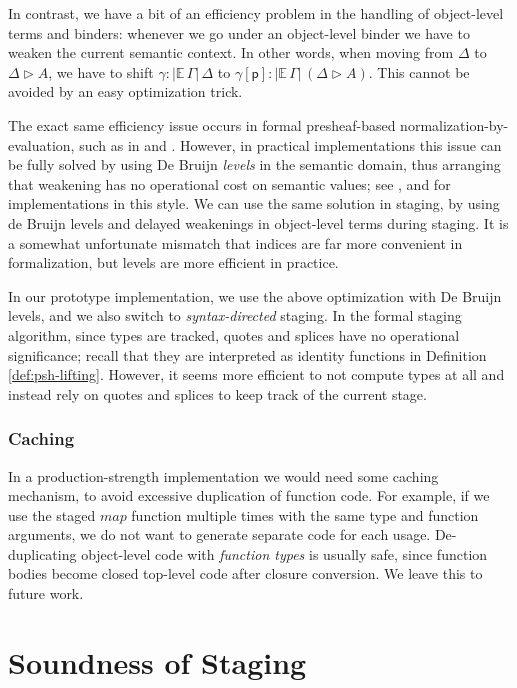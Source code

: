 \documentclass[acmsmall]{acmart}
\newcommand{\mit}[1]{\mathit{#1}}
\newcommand{\mbb}[1]{\mathbb{#1}}
\newcommand{\ext}{\triangleright}
\newcommand{\p}{\mathsf{p}}
\newcommand{\ev}{\mbb{E}}
\theoremstyle{remark}
\begin{document}
In contrast, we have a bit of an efficiency problem in the handling of object-level
terms and binders: whenever we go under an object-level binder we have to weaken
the current semantic context. In other words, when moving from $\Delta$ to
$\Delta \ext A$, we have to shift $\gamma : |\ev\,\Gamma|\,\Delta$ to
$\gamma[\p] : |\ev\,\Gamma|\,(\Delta \ext A)$. This cannot be avoided by an easy
optimization trick.

The exact same efficiency issue occurs in formal presheaf-based
normalization-by-evaluation, such as in \cite{kaposinbe} and
\cite{coquand2018canonicity}. However, in practical implementations this issue
can be fully solved by using De Bruijn \emph{levels} in the semantic domain,
thus arranging that weakening has no operational cost on semantic values; see
\cite{coquand1996algorithm}, \cite{modulartc} and \cite{untypedtc} for
implementations in this style. We can use the same solution in staging, by using
de Bruijn levels and delayed weakenings in object-level terms during staging. It
is a somewhat unfortunate mismatch that indices are far more convenient in
formalization, but levels are more efficient in practice.

In our prototype implementation, we use the above optimization with De Bruijn
levels, and we also switch to \emph{syntax-directed} staging. In the formal
staging algorithm, since types are tracked, quotes and splices have no
operational significance; recall that they are interpreted as identity functions
in Definition \ref{def:psh-lifting}. However, it seems more efficient to not compute types
at all and instead rely on quotes and splices to keep track of the current
stage.

\subsubsection{Caching} In a production-strength implementation we would need some
caching mechanism, to avoid excessive duplication of function code. For example,
if we use the staged $\mit{map}$ function multiple times with the same type and
function arguments, we do not want to generate separate code for each
usage. De-duplicating object-level code with \emph{function types} is
usually safe, since function bodies become closed top-level code after closure
conversion. We leave this to future work.

\section{Soundness of Staging}\label{sec:soundness}
\end{document}
